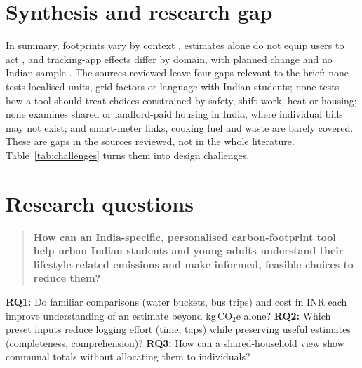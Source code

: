 \documentclass[12pt,a4paper,twocolumn]{article}
\begin{document}
\section{Synthesis and research gap}
In summary, footprints vary by context \cite{lee2021,gandhi2025}, estimates alone do not equip users to act \cite{mulrow2019,collins2020}, and tracking-app effects differ by domain, with planned change and no Indian sample \cite{hoffmann2024,lasarov2024}. The sources reviewed leave four gaps relevant to the brief: none tests localised units, grid factors or language with Indian students; none tests how a tool should treat choices constrained by safety, shift work, heat or housing; none examines shared or landlord-paid housing in India, where individual bills may not exist; and smart-meter links, cooking fuel and waste are barely covered. These are gaps in the sources reviewed, not in the whole literature. Table~\ref{tab:challenges} turns them into design challenges.

\section{Research questions}
\begin{quote}
\small
\textbf{How can an India-specific, personalised carbon-footprint tool help urban Indian students and young adults understand their lifestyle-related emissions and make informed, feasible choices to reduce them?}
\end{quote}
\textbf{RQ1:} Do familiar comparisons (water buckets, bus trips) and cost in INR each improve understanding of an estimate beyond kg\,CO$_2$e alone? \textbf{RQ2:} Which preset inputs reduce logging effort (time, taps) while preserving useful estimates (completeness, comprehension)? \textbf{RQ3:} How can a shared-household view show communal totals without allocating them to individuals?
\end{document}
